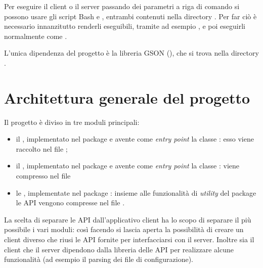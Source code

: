 \documentclass[
    oneside,
    10pt,
    language=italian,
    a4paper,
    article
]{notes}
\begin{document}
Per eseguire il client o il server passando dei parametri a riga di comando si
possono usare gli script Bash  e ,
entrambi contenuti nella directory . Per far ciò è necessario
innanzitutto renderli eseguibili, tramite ad esempio 
, e poi eseguirli
normalmente come .

L'unica dipendenza del progetto è la libreria GSON (),
che si trova nella directory .

\section{Architettura generale del progetto} \label{sec:arch}
Il progetto è diviso in tre moduli principali: \begin{itemize}
    \item il , implementato nel package 
        e avente come \emph{entry point} la classe 
        : esso viene raccolto
        nel file ;
    \item il , implementato nel package 
        e avente come \emph{entry point} la classe
        : viene compresso nel
        file 
    \item le , implementate nel package :
        insieme alle funzionalità di \emph{utility} del package 
         le API vengono compresse nel file
        .
\end{itemize}

La scelta di separare le API dall'applicativo client ha lo scopo di separare il
più possibile i vari moduli: così facendo si lascia aperta la possibilità
di creare un client diverso che riusi le API fornite per interfacciarsi con
il server.
Inoltre sia il client che il server dipendono dalla libreria delle API per 
realizzare alcune funzionalità (ad esempio il parsing dei file di configurazione).
\end{document}
